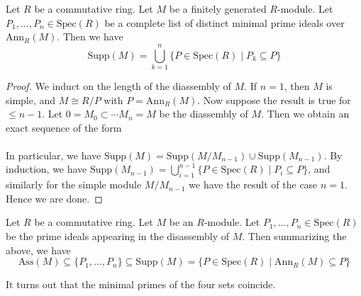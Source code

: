 \documentclass[a4paper]{article}
\begin{document}
\begin{lmm}{}{} Let $R$ be a commutative ring. Let $M$ be a finitely generated $R$-module. Let $P_1,\dots,P_n\in\text{Spec}(R)$ be a complete list of distinct minimal prime ideals over $\text{Ann}_R(M)$. Then we have $$\text{Supp}(M)=\bigcup_{k=1}^n\{P\in\text{Spec}(R)\;|\;P_k\subseteq P\}$$ 
\begin{proof}
We induct on the length of the diassembly of $M$. If $n=1$, then $M$ is simple, and $M\cong R/P$ with $P=\text{Ann}_R(M)$. Now suppose the result is true for $\leq n-1$. Let $0=M_0\subset\cdots M_n=M$ be the diassembly of $M$. Then we obtain an exact sequence of the form \\
\\
In particular, we have $\text{Supp}(M)=\text{Supp}(M/M_{n-1})\cup\text{Supp}(M_{n-1})$. By induction, we have $\text{Supp}(M_{n-1})=\bigcup_{i=1}^{n-1}\{P\in\text{Spec}(R)\;|\;P_i\subseteq P\}$, and similarly for the simple module $M/M_{n-1}$ we have the result of the case $n=1$. Hence we are done. 
\end{proof}
\end{lmm}

Let $R$ be a commutative ring. Let $M$ be an $R$-module. Let $P_1,\dots,P_n\in\text{Spec}(R)$ be the prime ideals appearing in the disassembly of $M$. Then summarizing the above, we have $$\text{Ass}(M)\subseteq\{P_1,\dots,P_n\}\subseteq\text{Supp}(M)=\{P\in\text{Spec}(R)\;|\;\text{Ann}_R(M)\subseteq P\}$$

It turns out that the minimal primes of the four sets coincide. 
\end{document}
